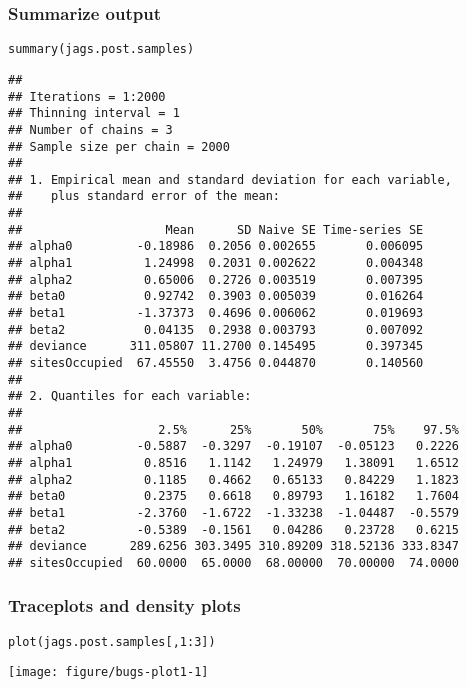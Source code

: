 \documentclass[color=usenames,dvipsnames]{beamer}\usepackage[]{graphicx}\usepackage[]{color}
\makeatletter
\newcommand{\hlnum}[1]{\textcolor[rgb]{0.69,0.494,0}{#1}}%
\newcommand{\hlopt}[1]{\textcolor[rgb]{0,0,0}{#1}}%
\newcommand{\hlstd}[1]{\textcolor[rgb]{0,0,0}{#1}}%
\newcommand{\hlkwd}[1]{\textcolor[rgb]{0.004,0.004,0.506}{#1}}%
\newenvironment{kframe}{%
 \def\at@end@of@kframe{}%
 \ifinner\ifhmode%
  \def\at@end@of@kframe{\end{minipage}}%
  \begin{minipage}{\columnwidth}%
 \fi\fi%
 \def\FrameCommand##1{\hskip\@totalleftmargin \hskip-\fboxsep
 \colorbox{shadecolor}{##1}\hskip-\fboxsep
     \hskip-\linewidth \hskip-\@totalleftmargin \hskip\columnwidth}%
 \MakeFramed {\advance\hsize-\width
   \@totalleftmargin\z@ \linewidth\hsize
   \@setminipage}}%
 {\par\unskip\endMakeFramed%
 \at@end@of@kframe}
\newenvironment{knitrout}{}{} %
\makeatother
\begin{document}
\begin{frame}[fragile]
  \frametitle{Summarize output}
\begin{knitrout}\tiny
{}\color{fgcolor}\begin{kframe}
\begin{alltt}
\hlkwd{summary}\hlstd{(jags.post.samples)}
\end{alltt}
\begin{verbatim}
## 
## Iterations = 1:2000
## Thinning interval = 1 
## Number of chains = 3 
## Sample size per chain = 2000 
## 
## 1. Empirical mean and standard deviation for each variable,
##    plus standard error of the mean:
## 
##                    Mean      SD Naive SE Time-series SE
## alpha0         -0.18986  0.2056 0.002655       0.006095
## alpha1          1.24998  0.2031 0.002622       0.004348
## alpha2          0.65006  0.2726 0.003519       0.007395
## beta0           0.92742  0.3903 0.005039       0.016264
## beta1          -1.37373  0.4696 0.006062       0.019693
## beta2           0.04135  0.2938 0.003793       0.007092
## deviance      311.05807 11.2700 0.145495       0.397345
## sitesOccupied  67.45550  3.4756 0.044870       0.140560
## 
## 2. Quantiles for each variable:
## 
##                   2.5%      25%       50%       75%    97.5%
## alpha0         -0.5887  -0.3297  -0.19107  -0.05123   0.2226
## alpha1          0.8516   1.1142   1.24979   1.38091   1.6512
## alpha2          0.1185   0.4662   0.65133   0.84229   1.1823
## beta0           0.2375   0.6618   0.89793   1.16182   1.7604
## beta1          -2.3760  -1.6722  -1.33238  -1.04487  -0.5579
## beta2          -0.5389  -0.1561   0.04286   0.23728   0.6215
## deviance      289.6256 303.3495 310.89209 318.52136 333.8347
## sitesOccupied  60.0000  65.0000  68.00000  70.00000  74.0000
\end{verbatim}
\end{kframe}
\end{knitrout}
\end{frame}




\begin{frame}[fragile]
  \frametitle{Traceplots and density plots}
\begin{knitrout}\footnotesize
{}\color{fgcolor}\begin{kframe}
\begin{alltt}
\hlkwd{plot}\hlstd{(jags.post.samples[,}\hlnum{1}\hlopt{:}\hlnum{3}\hlstd{])}
\end{alltt}
\end{kframe}

{\centering \texttt{[image: figure/bugs-plot1-1]} 

}



\end{knitrout}
\end{frame}
\end{document}
